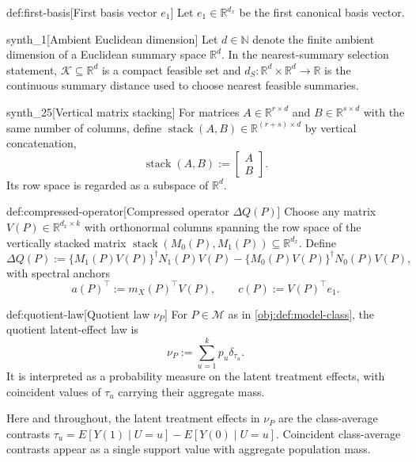 \documentclass[11pt]{article}
\begin{document}
\begin{definitionv}{def:first-basis}[First basis vector \(e_1\)]
Let \(e_1\in\mathbb R^{d_x}\) be the first canonical basis vector.
\end{definitionv}

\begin{definitionv}{synth_1}[Ambient Euclidean dimension]
Let \(d\in\mathbb N\) denote the finite ambient dimension of a Euclidean summary space \(\mathbb R^d\). In the nearest-summary selection statement, \(\mathcal K\subseteq\mathbb R^d\) is a compact feasible set and \(d_S:\mathbb R^d\times\mathbb R^d\to\mathbb R\) is the continuous summary distance used to choose nearest feasible summaries.
\end{definitionv}

\begin{definitionv}{synth_25}[Vertical matrix stacking]
For matrices \(A\in\mathbb R^{r\times d}\) and \(B\in\mathbb R^{s\times d}\) with the same number of columns, define \(\operatorname{stack}(A,B)\in\mathbb R^{(r+s)\times d}\) by vertical concatenation,\[\operatorname{stack}(A,B):=\begin{bmatrix}A\\ B\end{bmatrix}.\] Its row space is regarded as a subspace of \(\mathbb R^d\).
\end{definitionv}

\begin{definitionv}{def:compressed-operator}[Compressed operator \(\Delta Q(P)\)]
Choose any matrix \(V(P)\in\mathbb R^{d_x\times k}\) with orthonormal columns spanning the row space of the vertically stacked matrix \(\operatorname{stack}(M_0(P),M_1(P))\subseteq\mathbb R^{d_x}\). Define
\[
\Delta Q(P)
:=
\{M_1(P)V(P)\}^{\dagger}N_1(P)V(P)
-
\{M_0(P)V(P)\}^{\dagger}N_0(P)V(P),
\]
with spectral anchors
\[
a(P)^\top:=m_X(P)^\top V(P),
\qquad
c(P):=V(P)^\top e_1.
\]
\end{definitionv}

\begin{definitionv}{def:quotient-law}[Quotient law \(\nu_P\)]
For \(P\in\mathcal M\) as in \cref{obj:def:model-class}, the quotient latent-effect law is
\[
\nu_P:=\sum_{u=1}^{k}p_u\delta_{\tau_u}.
\]
It is interpreted as a probability measure on the latent treatment effects, with coincident values of \(\tau_u\) carrying their aggregate mass.
\end{definitionv}

Here and throughout, the latent treatment effects in \(\nu_P\) are the class-average contrasts \(\tau_u=E[Y(1)\mid U=u]-E[Y(0)\mid U=u]\). Coincident class-average contrasts appear as a single support value with aggregate population mass.
\end{document}
